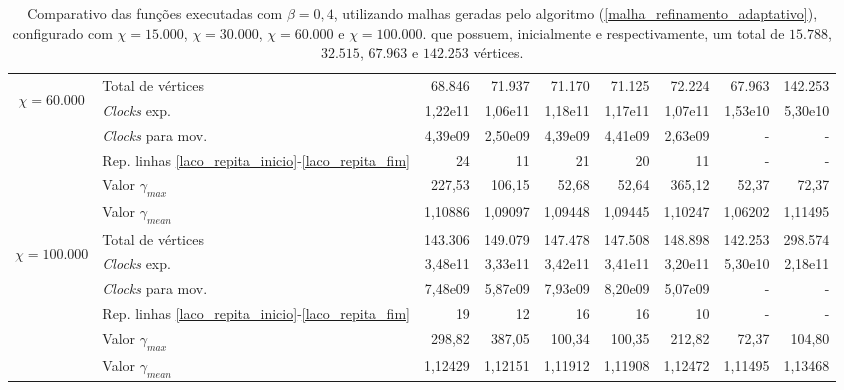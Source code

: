\begin{table}
\begin{center}
\begin{tabular}{|c|l|r|r|r|r|r|r|r|}
\hline %
\multirow{5}{*}{\begin{sideways}$\chi = 60.000$\end{sideways} } 
& Total de vértices                                                     & 68.846 & 71.937 & 71.170 & 71.125 & 72.224 & 67.963 & 142.253 \\
& {\it Clocks} exp.	                                             	& 1,22e11 & 1,06e11 & 1,18e11 & 1,17e11 & 1,07e11 & 1,53e10 &  5,30e10 \\
& {\it Clocks} para mov.                                      		& 4,39e09 & 2,50e09 & 4,39e09 & 4,41e09 & 2,63e09 & - & - \\
& Rep. linhas \ref{laco_repita_inicio}-\ref{laco_repita_fim} 		& 24 & 11 & 21 & 20 & 11 & - & - \\
& Valor $\gamma_{max}$							& 227,53 & 106,15 & 52,68 & 52,64 & 365,12 & 52,37 & 72,37 \\
& Valor $\gamma_{mean}$							& 1,10886 & 1,09097 & 1,09448 & 1,09445 & 1,10247 & 1,06202 & 1,11495 \\
\hline %
\multirow{5}{*}{\begin{sideways}$\chi = 100.000$\end{sideways} } 
& Total de vértices                                                     & 143.306 & 149.079 & 147.478 & 147.508 & 148.898 & 142.253 & 298.574 \\
& {\it Clocks} exp.	                                             	& 3,48e11 & 3,33e11 & 3,42e11 & 3,41e11 & 3,20e11 & 5,30e10 & 2,18e11 \\
& {\it Clocks} para mov.                                      		& 7,48e09 & 5,87e09 & 7,93e09 & 8,20e09 & 5,07e09 & - & - \\
& Rep. linhas \ref{laco_repita_inicio}-\ref{laco_repita_fim} 		& 19 & 12 & 16 & 16 & 10 & - & - \\
& Valor $\gamma_{max}$							& 298,82 & 387,05 & 100,34 & 100,35 & 212,82 & 72,37 & 104,80 \\
& Valor $\gamma_{mean}$							& 1,12429 & 1,12151 & 1,11912 & 1,11908 & 1,12472 & 1,11495 & 1,13468 \\
\hline %
\end{tabular}%
\end{center}
\caption{Comparativo das funções executadas com $\beta = 0,4$, utilizando malhas geradas pelo algoritmo (\ref{malha_refinamento_adaptativo}), configurado com $\chi = 15.000$, $\chi = 30.000$, $\chi = 60.000$ e $\chi = 100.000$. que possuem, inicialmente e respectivamente, um total de $15.788$, $32.515$, $67.963$ e $142.253$ vértices.} %
\label{tabelaComparativo_beta_4}
\end{table}

